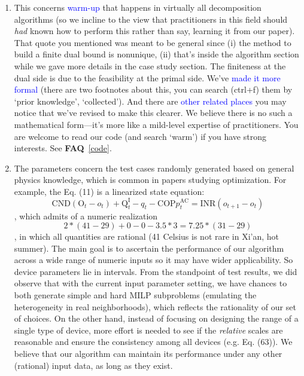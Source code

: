 \documentclass[11pt]{article}
\newcommand{\faq}[1]{\textbf{FAQ}~\ref{#1}}
\newcommand{\blue}[1]{\textcolor{blue}{#1}}
\begin{document}
\begin{enumerate}
    So, incorporating more complicated models locally at intra-block level might be done in future researches.
    \par
    So this is not a limitation. We've \blue{added a footnote in Section II} to clarify this.
    \item This concerns \blue{warm-up} that happens in virtually all decomposition algorithms (so
    we incline to the view that practitioners in this field should \textit{had} known how
    to perform this rather than say, learning it from our paper).
    That quote you mentioned was meant to be general since (i) the method to build a finite dual bound is nonunique,
    (ii) that's inside the algorithm section while we gave more details in the case study section.
    The finiteness at the dual side is due to the feasibility at the primal side.
    We've \blue{made it more formal} (there are two footnotes about this, you can search (ctrl+f) them by `prior knowledge', `collected').
    And there are \blue{other related places} you may notice that we've revised to make this clearer.
    We believe there is no such a mathematical form---it's more like a mild-level expertise of practitioners.
    You are welcome to read our code (and search `warm') if you have strong interests. See \faq{code}.
    \item The parameters concern the test cases randomly generated based on general physics knowledge, which is common in papers studying optimization.
    For example, the Eq. (11) is a linearized state equation:
    \[
        \mathrm{CND}(\mathrm{O}_t - o_t) + \mathrm{Q}^\mathrm{I}_t - q_t - \mathrm{COP} p^\mathrm{AC}_t = \mathrm{INR}(o_{t+1}-o_t)
    \],
    which admits of a numeric realization
    \[
        2*(41-29) + 0 - 0 - 3.5*3 = 7.25 * (31-29)
    \], in which all quantities are rational (41 Celsius is not rare in Xi'an, hot summer).
    The main goal is to ascertain the performance of our algorithm across a wide range of numeric inputs so it may have wider applicability. So device parameters lie in intervals.
    From the standpoint of test results, we did observe that with the current input parameter setting,
    we have chances to both generate simple and hard MILP subproblems (emulating the heterogeneity
    in real neighborhoods), which reflects the rationality of our set of choices.
    On the other hand, instead of focusing on designing the range of a single type of device,
    more effort is needed to see if the \textit{relative} scales are reasonable and ensure the consistency
    among all devices (e.g. Eq. (63)).
    We believe that our algorithm can maintain its performance under any other (rational) input data, as long as they exist.
\end{enumerate}
\end{document}

